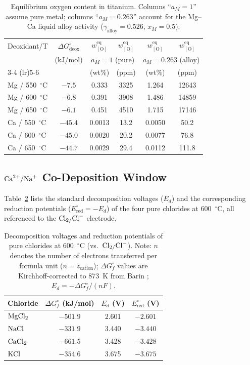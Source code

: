 \documentclass[sn-mathphys,Numbered]{sn-jnl}
\begin{document}
\begin{table}[!ht]
\centering
\footnotesize
\caption{Equilibrium oxygen content in titanium. Columns ``$a_M=1$'' assume pure metal; columns ``$a_M=0.263$'' account for the Mg--Ca liquid alloy activity ($\gamma_{\mathrm{alloy}}=0.526$, $x_M=0.5$).}
\label{tab:deox}
\begin{tabular}{lccccc}
\toprule
Deoxidant/T & $\Delta G^{\circ}_{\mathrm{deox}}$ & $w_{[\mathrm{O}]}^{\mathrm{eq}}$ & $w_{[\mathrm{O}]}^{\mathrm{eq}}$ & $w_{[\mathrm{O}]}^{\mathrm{eq}}$ & $w_{[\mathrm{O}]}^{\mathrm{eq}}$ \\
 & (kJ/mol) & \multicolumn{2}{c}{$a_M=1$ (pure)} & \multicolumn{2}{c}{$a_M=0.263$ (alloy)} \\
\cmidrule(lr){3-4} \cmidrule(lr){5-6}
 & & (wt\%) & (ppm) & (wt\%) & (ppm) \\
\midrule
Mg / 550~$^{\circ}$C & $-7.5$ & 0.333 & 3325 & 1.264 & 12643 \\
Mg / 600~$^{\circ}$C & $-6.8$ & 0.391 & 3908 & 1.486 & 14859 \\
Mg / 650~$^{\circ}$C & $-6.1$ & 0.451 & 4510 & 1.715 & 17146 \\
Ca / 550~$^{\circ}$C & $-45.4$ & 0.0013 & 13.2 & 0.0050 & 50.2 \\
Ca / 600~$^{\circ}$C & $-45.0$ & 0.0020 & 20.2 & 0.0077 & 76.8 \\
Ca / 650~$^{\circ}$C & $-44.7$ & 0.0029 & 29.4 & 0.0112 & 111.8 \\
\bottomrule
\end{tabular}
\end{table}

\subsection{$\ce{Ca^{2+}/Na+}$ Co-Deposition Window}

Table~\ref{tab:Ed} lists the standard decomposition voltages ($E_d$) and the corresponding reduction potentials ($E^{\circ}_{\mathrm{red}} = -E_d$) of the four pure chlorides at 600~$^{\circ}$C, all referenced to the $\ce{Cl2/Cl-}$ electrode.

\begin{table}[!ht]
\centering
\footnotesize
\caption{Decomposition voltages and reduction potentials of pure chlorides at 600~$^{\circ}$C (vs.\ $\ce{Cl2/Cl-}$). Note: $n$ denotes the number of electrons transferred per formula unit ($n = z_{\mathrm{cation}}$); $\Delta G^{\circ}_f$ values are Kirchhoff-corrected to 873~K from Barin \cite{barin1995}; $E_d = -\Delta G^{\circ}_f/(nF)$.}
\label{tab:Ed}
\begin{tabular}{lccc}
\toprule
Chloride & $\Delta G^{\circ}_f$ (kJ/mol) & $E_d$ (V) & $E^{\circ}_{\mathrm{red}}$ (V) \\
\midrule
$\ce{MgCl2}$ & $-501.9$ & 2.601 & $-2.601$ \\
$\ce{NaCl}$  & $-331.9$ & 3.440 & $-3.440$ \\
$\ce{CaCl2}$ & $-661.5$ & 3.428 & $-3.428$ \\
$\ce{KCl}$   & $-354.6$ & 3.675 & $-3.675$ \\
\bottomrule
\end{tabular}
\end{table}
\end{document}
